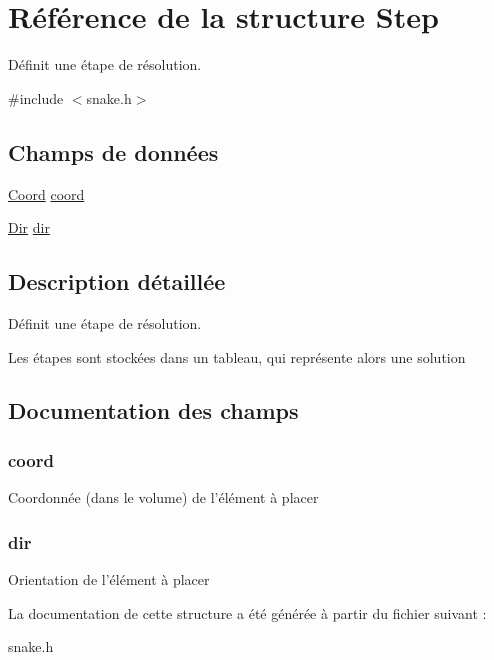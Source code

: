 \hypertarget{struct_step}{\section{Référence de la structure Step}
\label{struct_step}
}


Définit une étape de résolution.  




{\ttfamily \#include $<$snake.\-h$>$}

\subsection*{Champs de données}
\begin{DoxyCompactItemize}
\item 
\hyperlink{struct_coord}{Coord} \hyperlink{struct_step_a825b51abf06a992115019d263c27dfc3}{coord}
\item 
\hyperlink{group___snake_ga7cf6e8c5a5bc5e7b2afef3647870b1c4}{Dir} \hyperlink{struct_step_a4ca269cf93df1b512b52174c1a256fe5}{dir}
\end{DoxyCompactItemize}


\subsection{Description détaillée}
Définit une étape de résolution. 

Les étapes sont stockées dans un tableau, qui représente alors une solution 

\subsection{Documentation des champs}
\hypertarget{struct_step_a825b51abf06a992115019d263c27dfc3}{
\subsubsection[{coord}]{\setlength{\rightskip}{0pt plus 5cm}coord}}\label{struct_step_a825b51abf06a992115019d263c27dfc3}
Coordonnée (dans le volume) de l'élément à placer \hypertarget{struct_step_a4ca269cf93df1b512b52174c1a256fe5}{
\subsubsection[{dir}]{\setlength{\rightskip}{0pt plus 5cm}dir}}\label{struct_step_a4ca269cf93df1b512b52174c1a256fe5}
Orientation de l'élément à placer 

La documentation de cette structure a été générée à partir du fichier suivant \-:\begin{DoxyCompactItemize}
\item 
snake.\-h\end{DoxyCompactItemize}

